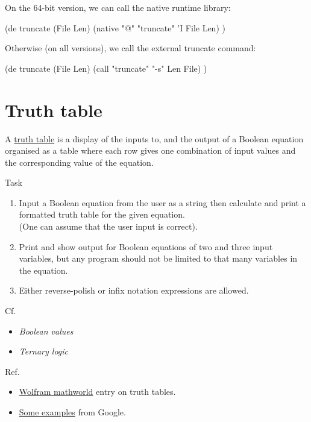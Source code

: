 \begin{wideverbatim}

On the 64-bit version, we can call the native runtime library:

(de truncate (File Len)
   (native "@" "truncate" 'I File Len) )

Otherwise (on all versions), we call the external truncate command:

(de truncate (File Len)
   (call "truncate" "-s" Len File) )

\end{wideverbatim}

\pagebreak{}
\section*{Truth table}

A \href{http://en.wikipedia.org/wiki/Truth\_table}{truth table} is a
display of the inputs to, and the output of a Boolean equation organised
as a table where each row gives one combination of input values and the
corresponding value of the equation.

\begin{description}
\item[Task]
\end{description}

\begin{enumerate}
\item
  Input a Boolean equation from the user as a string then calculate and
  print a formatted truth table for the given equation.\\ (One can
  assume that the user input is correct).
\item
  Print and show output for Boolean equations of two and three input
  variables, but any program should not be limited to that many
  variables in the equation.
\item
  Either reverse-polish or infix notation expressions are allowed.
\end{enumerate}

Cf.

\begin{itemize}
\item
  \emph{Boolean values}
\item
  \emph{Ternary logic}
\end{itemize}

Ref.

\begin{itemize}
\item
  \href{http://mathworld.wolfram.com/TruthTable.html}{Wolfram mathworld}
  entry on truth tables.
\item
  \href{http://www.google.co.uk/search?q=truth+table\&hl=en\&client=firefox-a\&hs=Om7\&rls=org.mozilla:en-GB:official\&prmd=imvns\&tbm=isch\&tbo=u\&source=univ\&sa=X\&ei=C0uuTtjuH4Wt8gOF4dmYCw\&ved=0CDUQsAQ\&biw=941\&bih=931\&sei=\%20Jk-uTuKKD4Sg8QOFkPGcCw}{Some
  examples} from Google.
\end{itemize}


